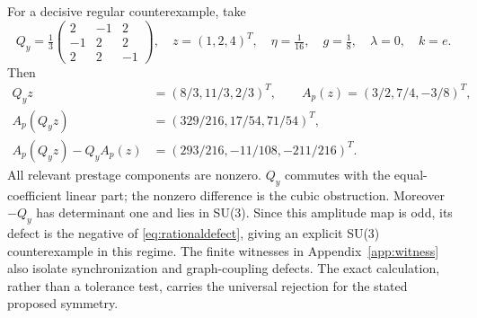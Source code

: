 \documentclass[11pt,a4paper]{article}
\numberwithin{equation}{section}
\begin{document}
For a decisive regular counterexample, take
\begin{equation}\label{eq:qmatrix}
 Q_y=\tfrac13\begin{pmatrix}2&-1&2\\-1&2&2\\2&2&-1\end{pmatrix},\quad
 z=(1,2,4)^T,\quad \eta=\tfrac1{16},\quad g=\tfrac18,\quad\lambda=0,\quad k=e.
\end{equation}
Then
\begin{align}
 Q_yz&=(8/3,11/3,2/3)^T,\qquad A_p(z)=(3/2,7/4,-3/8)^T,\nonumber\\
 A_p(Q_yz)&=(329/216,17/54,71/54)^T,\nonumber\\
 A_p(Q_yz)-Q_yA_p(z)&=(293/216,-11/108,-211/216)^T.\label{eq:rationaldefect}
\end{align}
All relevant prestage components are nonzero. $Q_y$ commutes with the equal-coefficient linear part; the nonzero difference is the cubic obstruction. Moreover $-Q_y$ has determinant one and lies in SU(3). Since this amplitude map is odd, its defect is the negative of \eqref{eq:rationaldefect}, giving an explicit SU(3) counterexample in this regime. The finite witnesses in Appendix~\ref{app:witness} also isolate synchronization and graph-coupling defects. The exact calculation, rather than a tolerance test, carries the universal rejection for the stated proposed symmetry.
\end{document}
